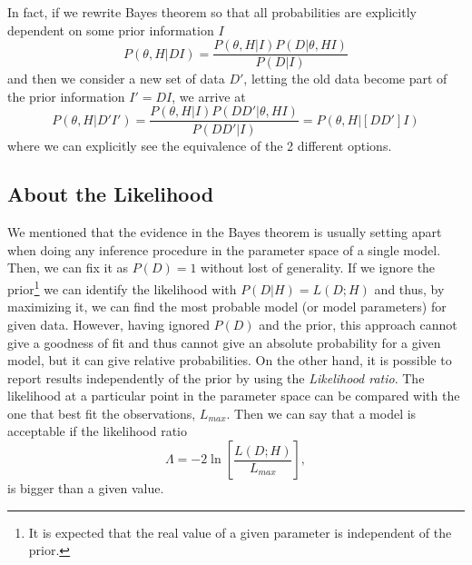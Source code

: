 \documentclass[onecolumn,           %
               showpacs,            %
               preprintnumbers,     %
               aps,                 %
               prl,          	    %
               letterpaper,             %
               superscriptaddress,      %
               nofootinbib,         %
               tightenlines,        %
               floats,floatfix      %
               ,usenatbib,
               ]{revtex4-1}
\begin{document}
In fact, if we rewrite Bayes theorem so that all probabilities are explicitly dependent on some prior information $I$
\begin{equation}\label{BayesTI}
P(\theta,H|DI)=\frac{P(\theta,H|I)P(D|\theta,HI)}{P(D|I)}
\end{equation}
and then we consider a new set of data $D'$, letting the old data become part of the prior information $I'=DI$, we arrive at \cite{AlanH}   
\begin{equation}
P(\theta,H|D'I')=\frac{P(\theta,H|I)P(DD'|\theta,HI)}{P(DD'|I)}=P(\theta,H|[DD']I)
\end{equation}
where we can explicitly see the equivalence of the 2 different options. 
\subsection{About the Likelihood}

We mentioned that the evidence in the Bayes theorem is usually setting apart when doing any inference procedure in the parameter space of a single model. Then, we can fix it as $P(D)=1$ without lost of generality. If we ignore the prior\footnote{It is expected that the real value of a given parameter is independent of the prior.} we can identify the likelihood with $P(D|H)=L(D;H)$ and thus, by maximizing it, we can find the most probable model (or model parameters) for given data. However, having ignored $P(D)$ and the prior, this approach cannot give a goodness of fit and thus cannot give an absolute probability for a given model, but it can give relative probabilities. On the other hand, it is possible to report results independently of the prior by using the \textit{Likelihood ratio}. The likelihood at a particular point in the parameter space can be compared with the one that best fit the observations, $L_{max}$. Then we can say that a model is acceptable if the likelihood ratio
\begin{equation}
\Lambda=-2\ln\left[\frac{L(D;H)}{L_{max}}\right],
\end{equation}
is bigger than a given value.
\end{document}
